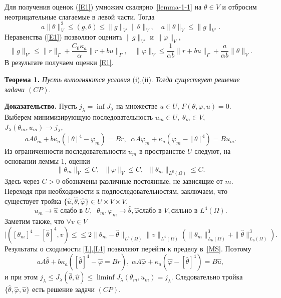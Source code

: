 \documentclass[12pt]{article}
\begin{document}
    Для получения оценок (\ref{E1}) умножим скалярно~\eqref{lemma-1-1} на $\theta \in V$ и отбросим неотрицательные
    слагаемые в левой части. Тогда
    $$
    a \|\theta\|^2_V \leq (g, \theta) \leq \|g\|_{V'}\|\theta\|_V,
    \quad a\|\theta\|_V \leq \|g\|_{V'}.
    $$
    Неравенства (\ref{E1}) позволяют оценить $\|g\|_{V'}$ и $\|\varphi\|_V $,
    $$
    \|g\|_{V'} \leq \|r\|_\Gamma + \frac{C_0\kappa_a}{\alpha}\|r + bu\|_\Gamma, \quad
    \|\varphi\|_V \leq \frac{1}{\alpha b} \|r + bu\|_\Gamma + \frac{a}{\alpha b} \|\theta\|_V.
    $$
    В результате получаем оценки \eqref{E1}.

    \textbf{Теорема 1.}
    {\it
    Пусть выполняются условия} (i),(ii).
        {\it Тогда существует решение задачи $(CP).$
    }

        {\bf Доказательство.}
    Пусть $j_\lambda = \inf J_\lambda$ на множестве $u \in U$, $F(\theta, \varphi, u)=0.$
    Выберем минимизирующую последовательность
    $u_m \in U, \; \theta_m \in V$, $J_\lambda(\theta_m, u_m)
    \rightarrow j_\lambda,$
    \begin{equation}
        \label{MS}
        a A \theta_m +b \kappa_a([\theta]^4 - \varphi_m) = Br, \;\;
        \alpha A \varphi_m + \kappa_a (\varphi_m - [\theta]^4) = B u_m.
    \end{equation}
    Из ограниченности последовательности $u_m$ в пространстве $U$ следуют, на основании
    леммы 1, оценки
    $$
    \|\theta_m\|_V \leq C,\;\;
    \|\varphi\|_V \leq C,\;\;\|\theta_m\|_{L^6(\Omega)} \leq C.
    $$
    Здесь через $C>0$ обозначены различные постоянные, не зависящие от $m$.
    Переходя при необходимости к подпоследовательностям, заключаем, что
    существует тройка $\{ \hat{u}, \hat{\theta}, \hat{\varphi} \} \in U \times V \times V,$
    \begin{equation}
        \label{L}
        u_m \rightarrow \hat{u} \text{  слабо в } U, \;\;
        \theta_m, \varphi_m \rightarrow \hat{\theta}, \hat{\varphi} \text{
            слабо в } V, \text{
            сильно в } L^4(\Omega).
    \end{equation}
    Заметим также, что $\forall v \in V$
    \begin{equation}
        \label{L1}
        |( [\theta_m]^4 - [\hat{\theta}]^4, v) \leq
        \leq 2 \| \theta_m - \hat{\theta}\|_{L^4(\Omega)} \|v\|_{L^4(\Omega)}
        \left( \| \theta_m \|^3_{L_6(\Omega)} + \| \hat{\theta} \|^3_{L_6(\Omega)}\right).
    \end{equation}
    Результаты о сходимости \eqref{L},\eqref{L1} позволяют перейти
    к пределу в~\eqref{MS}. Поэтому
    \[
        a A \hat{\theta} + b \kappa_a ([\hat{\theta}]^4 - \hat{\varphi} = Br), \;
        \alpha A \hat{\varphi} + \kappa_a (\hat{\varphi} -[\hat{\theta}]^4) = B \hat{u},
    \]
    и при этом $j_\lambda \leq J_\lambda(\hat{\theta}, \hat{u}) \leq \liminf J_\lambda(\theta_m, u_m) =
    j_\lambda$.
    Следовательно тройка $\{\hat{\theta}, \hat{\varphi}, \hat{u} \}$ есть
    решение задачи $(CP).$
\end{document}
